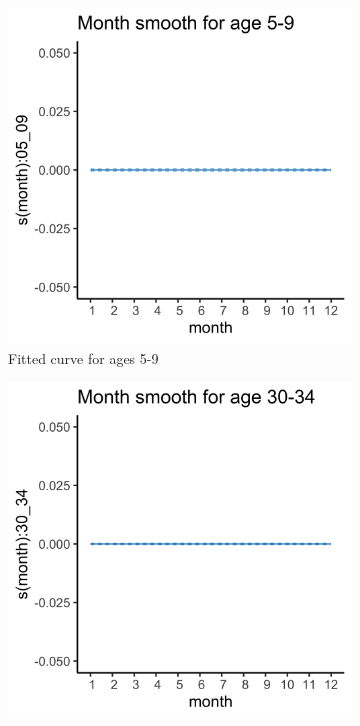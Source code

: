\documentclass[11pt]{article}
\begin{document}
\begin{figure}
\centering
\begin{subfigure}[t]{0.32\textwidth}
\centering
\includegraphics[scale=0.077]{figs/gam_plot1.png}
\caption{Fitted curve for ages 5-9}
\label{fig:gam_plot1}
\end{subfigure}
\begin{subfigure}[t]{0.32\textwidth}
\centering
\includegraphics[scale=0.077]{figs/gam_plot2.png}

\end{subfigure}
\end{figure}
\end{document}
